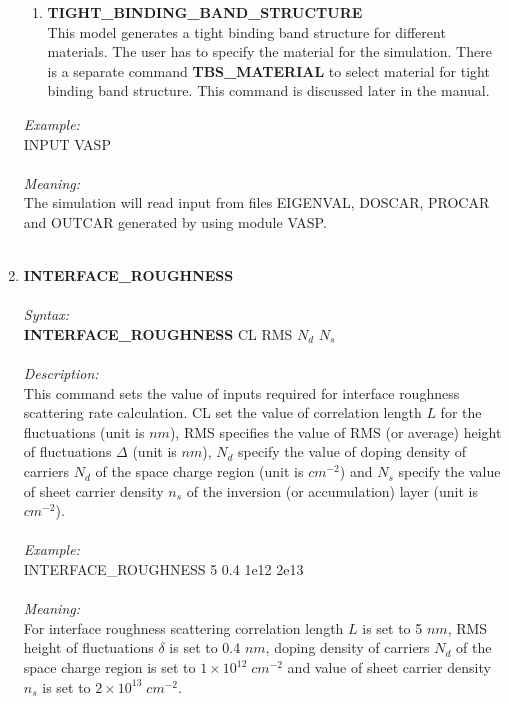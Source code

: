 \documentclass[12pt]{article}
\begin{document}
\begin{enumerate}
\begin{enumerate}
        \item \textbf{TIGHT\_BINDING\_BAND\_STRUCTURE} \\
        This model generates a tight binding band structure for different materials. The user has to specify the material for the simulation. There is a separate command \textbf{TBS\_MATERIAL} to select material for tight binding band structure. This command is discussed later in the manual. 
    \end{enumerate}
    
    \textit{Example:} \\ 
    INPUT VASP \\ \\
    \textit{Meaning:} \\    
    The simulation will read input from files EIGENVAL, DOSCAR, PROCAR and OUTCAR generated by using module VASP. \\ \\

    \item \textbf{INTERFACE\_ROUGHNESS}  \\ \\
    \textit{Syntax:} \\
    \textbf{INTERFACE\_ROUGHNESS} CL RMS $N_d$ $N_s$ \\ \\
    \textit{Description:} \\
    This command sets the value of inputs required for interface roughness scattering rate calculation. CL set the value of correlation length $L$ for the fluctuations (unit is $nm$), RMS specifies the value of RMS (or average) height of fluctuations $\Delta$ (unit is $nm$), $N_d$ specify the value of doping density of carriers $N_d$ of the space charge region (unit is $cm^{-2}$) and $N_s$ specify the value of sheet carrier density $n_s$ of the inversion (or accumulation) layer (unit is $cm^{-2}$). \\ \\  
    \textit{Example:} \\
    INTERFACE\_ROUGHNESS 5 0.4 1e12 2e13 \\ \\
    \textit{Meaning:} \\    
    For interface roughness scattering correlation length $L$ is set to 5 $nm$, RMS height of fluctuations $\delta$ is set to 0.4 $nm$, doping density of carriers $N_d$ of the space charge region is set to $1 \times 10^{12} \; cm^{-2}$ and value of sheet carrier density $n_s$ is set to $2 \times 10^{13} \; cm^{-2}$. \\ \\


\end{enumerate}
\end{document}
